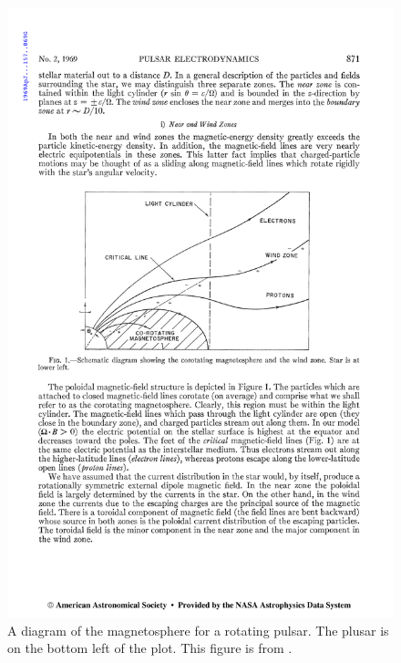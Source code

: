 \begin{figure}[htpb]
  \begin{center}
    \includegraphics[width=\textwidth]{chapters/introduction/figures/pulsar_magnetosphere.pdf}
  \end{center}
  \caption{A diagram of the magnetosphere for a rotating pulsar.
  The plusar is on the bottom left of the plot. This figure is
  from \cite{goldreich_1969_pulsar-electrodynamics}.}
\end{figure}




